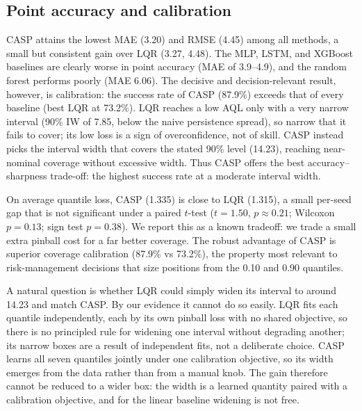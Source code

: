 \documentclass{article}
\begin{document}
\subsection{Point accuracy and calibration}
CASP attains the lowest MAE (3.20) and RMSE (4.45) among all methods, a small but consistent gain over LQR (3.27, 4.48). The MLP, LSTM, and XGBoost baselines are clearly worse in point accuracy (MAE of 3.9--4.9), and the random forest performs poorly (MAE 6.06). The decisive and decision-relevant result, however, is calibration: the success rate of CASP (87.9\%) exceeds that of every baseline (best LQR at 73.2\%). LQR reaches a low AQL only with a very narrow interval (90\% IW of 7.85, below the naive persistence spread), so narrow that it fails to cover; its low loss is a sign of overconfidence, not of skill. CASP instead picks the interval width that covers the stated 90\% level (14.23), reaching near-nominal coverage without excessive width. Thus CASP offers the best accuracy--sharpness trade-off: the highest success rate at a moderate interval width.

On average quantile loss, CASP (1.335) is close to LQR (1.315), a small per-seed gap that is not significant under a paired $t$-test ($t=1.50$, $p \approx 0.21$; Wilcoxon $p=0.13$; sign test $p=0.38$). We report this as a known tradeoff: we trade a small extra pinball cost for a far better coverage. The robust advantage of CASP is superior coverage calibration (87.9\% vs 73.2\%), the property most relevant to risk-management decisions that size positions from the 0.10 and 0.90 quantiles.

A natural question is whether LQR could simply widen its interval to around 14.23 and match CASP. By our evidence it cannot do so easily. LQR fits each quantile independently, each by its own pinball loss with no shared objective, so there is no principled rule for widening one interval without degrading another; its narrow boxes are a result of independent fits, not a deliberate choice. CASP learns all seven quantiles jointly under one calibration objective, so its width emerges from the data rather than from a manual knob. The gain therefore cannot be reduced to a wider box: the width is a learned quantity paired with a calibration objective, and for the linear baseline widening is not free.
\end{document}
